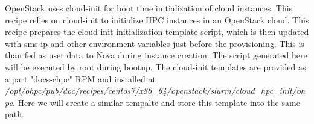 	OpenStack uses cloud-init for boot time initialization of cloud instances. This recipe relies on cloud-init to initialize HPC instances in an OpenStack cloud. This recipe prepares the cloud-init initialization template script, which is then updated with sms-ip and other environment variables just before the provisioning. This is than fed as user data to Nova during instance creation. The script generated here will be executed by root during bootup. 
The cloud-init templates are provided as a part "docs-chpc" RPM and installed at {\em /opt/ohpc/pub/doc/recipes/centos7/x86\_64/openstack/slurm/cloud\_hpc\_init/ohpc}. Here we will create a similar tempalte and store this template into the same path. 
